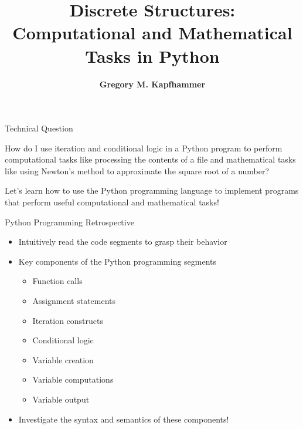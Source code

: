 \documentclass[14pt,aspectratio=169]{beamer}
\title{Discrete Structures: \\ Computational and Mathematical Tasks in Python}
\author{{\bf Gregory M. Kapfhammer}}
\institute[shortinst]{{\bf Department of Computer Science, Allegheny College}}
\begin{document}
{
  \begin{frame}
    \titlepage
  \end{frame}
}

%
\begin{frame}{Technical Question}
  \begin{center}
    {\large How do I use iteration and conditional logic in a Python program to
      perform computational tasks like processing the contents of a file and
      mathematical tasks like using Newton's method to approximate the square root
    of a number?}
  \end{center}
  \vspace{2ex}
  \begin{center}
    \small Let's learn how to use the Python programming language to implement
    programs that perform useful computational and mathematical tasks!
  \end{center}
\end{frame}

%
\begin{frame}{Python Programming Retrospective}
  \begin{itemize}
    \item Intuitively read the code segments to grasp their behavior
      \vspace*{-.15in}
    \item Key components of the Python programming segments
      \begin{itemize}
        \item Function calls
        \item Assignment statements
        \item Iteration constructs
        \item Conditional logic
        \item Variable creation
        \item Variable computations
        \item Variable output
      \end{itemize}
      \vspace*{-.2in}
    \item Investigate the syntax and semantics of these components!
  \end{itemize}
\end{frame}
\end{document}
